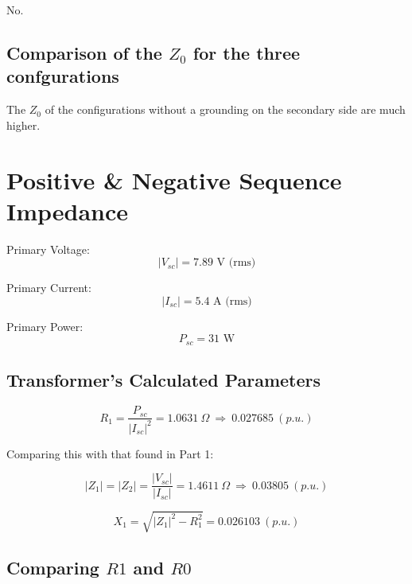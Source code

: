 \documentclass{article}
\begin{document}
No.

\subsection{Comparison of the $Z _0$ for the three confgurations} 

The $Z_0$ of the configurations without a grounding on the secondary side are much higher. 

\section{Positive \& Negative Sequence Impedance} 

Primary Voltage:
\begin{equation}
  | V _{sc} | = 7.89 \text{ V (rms)}
\end{equation}

Primary Current:
\begin{equation}
  | I _{sc} | = 5.4 \text{ A (rms)}
\end{equation}

Primary Power:
\begin{equation}
  P _{sc} = 31 \text{ W}
\end{equation}

\subsection{Transformer's Calculated Parameters} 

\begin{equation}
  R_1 = \frac{P_{sc}}{| I _{sc}|^2} = 1.0631 \ \Omega \ \Rightarrow \ 0.027685 \ (p.u.)
\end{equation}

Comparing this with that found in Part 1:


\begin{equation}
  | Z _1 | = | Z _2 | = \frac{|V_{sc}|}{|I_{sc}|} = 1.4611 \ \Omega \ \Rightarrow \ 0.03805 \ (p.u.)
\end{equation}

\begin{equation}
  X_1 = \sqrt{| Z _1 |^2 - R^2 _1} = 0.026103 \ (p.u.)
\end{equation}

\subsection{Comparing $R1$ and $R0$} 
\end{document}

